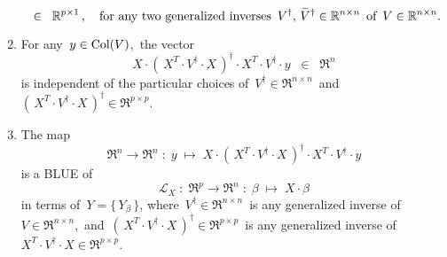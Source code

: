 \begin{theorem}
\begin{enumerate}
\begin{equation*}
	\;\; \in \;\; \Re^{p \times 1}\,,
	\quad
	\textnormal{for any two generalized inverses
	\,$V^{\dagger},\, \widetilde{V}^{\dagger} \in \Re^{n \times n}$\,
	of \,$V \in \Re^{n \times n}$}.
	\end{equation*}	
\item\label{XXtVdaggerXXtVdaggerY}
	For any \,$y \in \Col(V)$,\, the vector
	\begin{equation*}
	X \cdot \left(\,X^{T} \cdot V^{\dagger} \cdot X\,\right)^{\dagger} \cdot X^{T} \cdot V^{\dagger} \cdot y \;\; \in \;\; \Re^{n}
	\end{equation*}
	is independent of the particular choices of
	\,$V^{\dagger} \in \Re^{n \times n}$\,
	and
	\,$\left(\,X^{T} \cdot V^{\dagger} \cdot X\,\right)^{\dagger} \in \Re^{p \times p}$.
\item\label{formulaColXsubsetColV}
	The map
	\begin{equation*}
	\Re^{n} \longrightarrow \Re^{n}
	\; : \; y \; \longmapsto \;
	X \cdot \left(\,X^{T} \cdot V^{\dagger} \cdot X\,\right)^{\dagger} \cdot X^{T} \cdot V^{\dagger} \cdot y
	\end{equation*}
	is a BLUE of
	\begin{equation*}
	\mathcal{L}_{X} \; : \; \Re^{p} \longrightarrow \Re^{n} \; : \; \beta \; \longmapsto \; X \cdot \beta
	\end{equation*}
	in terms of
	\,$Y = \{\,Y_{\beta}\,\}$,
	where
	\,$V^{\dagger} \in \Re^{n \times n}$\, is any generalized inverse of \,$V \in \Re^{n \times n}$,\,
	and
	\,$\left(\,X^{T} \cdot V^{\dagger} \cdot X\,\right)^{\dagger} \in \Re^{p \times p}$\,
	is any generalized inverse of
	\,$X^{T} \cdot V^{\dagger} \cdot X \in \Re^{p \times p}$.

\end{enumerate}
\end{theorem}
